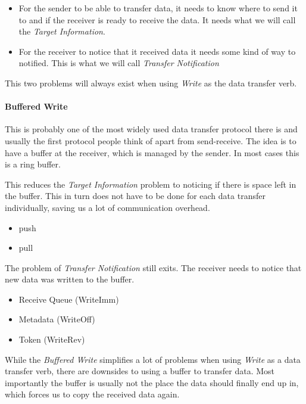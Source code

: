 \begin{itemize}
  \item For the sender to be able to transfer data, it needs to know where to send it to and if the receiver is ready 
to receive the data. It needs what we will call the \emph{Target Information}.

  \item For the receiver to notice that it received data it needs some kind of way to notified. This is what we will
call \emph{Transfer Notification}
\end{itemize}

This two problems will always exist when using \emph{Write} as the data transfer verb. 

\paragraph{Buffered Write}
This is probably one of the most widely used data transfer protocol there is and usually the first protocol people think of
apart from send-receive. The idea is to have a buffer at the receiver, which is managed by the sender. In most cases this is 
a ring buffer. 

This reduces the \emph{Target Information} problem to noticing if there is space left in the buffer. This in turn does not 
have to be done for each data transfer individually, saving us a lot of communication overhead.

\begin{itemize}
  \item push
  \item pull
\end{itemize}

The problem of \emph{Transfer Notification} still exits. The receiver needs to notice that new data was written to the buffer.

\begin{itemize}
  \item Receive Queue (WriteImm)
  \item Metadata (WriteOff)
  \item Token (WriteRev)
\end{itemize}

While the \emph{Buffered Write} simplifies a lot of problems when using \emph{Write} as a data transfer verb, there are 
downsides to using a buffer to transfer data. Most importantly the buffer is usually not the place the data should finally 
end up in, which forces us to copy the received data again.

